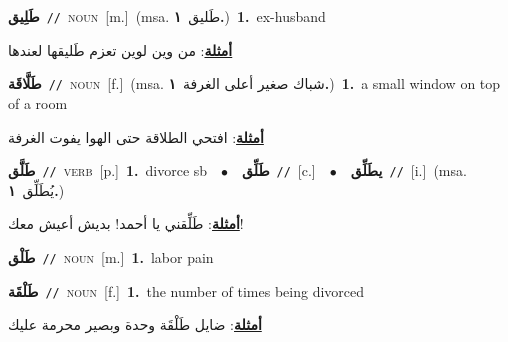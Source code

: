 \documentclass[10pt,a4paper,twoside]{article} %
\begin{document}
\begin{multicols}{2}
{\setlength\topsep{0pt}\textbf{\foreignlanguage{arabic}{طَلِيق}}\ {\color{gray}\texttt{//}\color{black}}\ \textsc{noun}\ [m.]\ \color{gray}(msa. \foreignlanguage{arabic}{طَليق}~\foreignlanguage{arabic}{\textbf{١.}})\color{black}\ \textbf{1.}~ex-husband\  \begin{flushright}\color{gray}\foreignlanguage{arabic}{\textbf{\underline{\foreignlanguage{arabic}{أمثلة}}}: من وين لوين تعزم طَليقها لعندها}\end{flushright}\color{black}} \vspace{2mm}

{\setlength\topsep{0pt}\textbf{\foreignlanguage{arabic}{طَلَّاقَة}}\ {\color{gray}\texttt{//}\color{black}}\ \textsc{noun}\ [f.]\ \color{gray}(msa. \foreignlanguage{arabic}{شباك صغير أعلى الغرفة}~\foreignlanguage{arabic}{\textbf{١.}})\color{black}\ \textbf{1.}~a small window on top of a room\  \begin{flushright}\color{gray}\foreignlanguage{arabic}{\textbf{\underline{\foreignlanguage{arabic}{أمثلة}}}: افتحي الطلاقة حتى الهوا يفوت الغرفة}\end{flushright}\color{black}} \vspace{2mm}

{\setlength\topsep{0pt}\textbf{\foreignlanguage{arabic}{طَلَّق}}\ {\color{gray}\texttt{//}\color{black}}\ \textsc{verb}\ [p.]\ \textbf{1.}~divorce sb\ \ $\bullet$\ \ \setlength\topsep{0pt}\textbf{\foreignlanguage{arabic}{طَلِّق}}\ {\color{gray}\texttt{//}\color{black}}\ [c.]\ \ $\bullet$\ \ \setlength\topsep{0pt}\textbf{\foreignlanguage{arabic}{يطَلِّق}}\ {\color{gray}\texttt{//}\color{black}}\ [i.]\ \color{gray}(msa. \foreignlanguage{arabic}{يُطَلِّق}~\foreignlanguage{arabic}{\textbf{١.}})\color{black}\  \begin{flushright}\color{gray}\foreignlanguage{arabic}{\textbf{\underline{\foreignlanguage{arabic}{أمثلة}}}: طَلِّقني يا أحمد! بديش أعيش معك!}\end{flushright}\color{black}} \vspace{2mm}

{\setlength\topsep{0pt}\textbf{\foreignlanguage{arabic}{طَلْق}}\ {\color{gray}\texttt{//}\color{black}}\ \textsc{noun}\ [m.]\ \textbf{1.}~labor pain\ } \vspace{2mm}

{\setlength\topsep{0pt}\textbf{\foreignlanguage{arabic}{طَلْقَة}}\ {\color{gray}\texttt{//}\color{black}}\ \textsc{noun}\ [f.]\ \textbf{1.}~the number of times being divorced\  \begin{flushright}\color{gray}\foreignlanguage{arabic}{\textbf{\underline{\foreignlanguage{arabic}{أمثلة}}}: ضايل طَلْقَة وحدة وبصير محرمة عليك}\end{flushright}\color{black}} \vspace{2mm}


\end{multicols}
\end{document}
